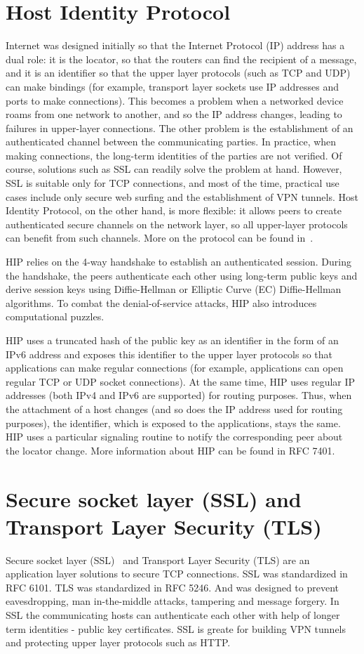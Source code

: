 \section{Host Identity Protocol}

Internet was designed initially so that the Internet Protocol (IP) address has a dual role: it 
is the locator, so that the routers can find the recipient of a message, and it is an identifier 
so that the upper layer protocols (such as TCP and UDP) can make bindings (for example, transport 
layer sockets use IP addresses and ports to make connections). This becomes a problem when a networked 
device roams from one network to another, and so the IP address changes, leading to failures in 
upper-layer connections. The other problem is the establishment of an authenticated channel between 
the communicating parties. In practice, when making connections, the long-term identities of the parties 
are not verified. Of course, solutions such as SSL can readily solve the problem at hand. However, SSL 
is suitable only for TCP connections, and most of the time, practical use cases include only secure web 
surfing and the establishment of VPN tunnels. Host Identity Protocol, on the other hand, is more flexible: 
it allows peers to create authenticated secure channels on the network layer, so all upper-layer protocols 
can benefit from such channels. More on the protocol can be found in~\cite{gurtov:hip}.

HIP relies on the 4-way handshake to establish an authenticated session. During the handshake, the 
peers authenticate each other using long-term public keys and derive session keys using Diffie-Hellman 
or Elliptic Curve (EC) Diffie-Hellman algorithms. To combat the denial-of-service attacks, HIP also 
introduces computational puzzles. 

HIP uses a truncated hash of the public key as an identifier in the form of an IPv6 address and 
exposes this identifier to the upper layer protocols so that applications can make regular 
connections (for example, applications can open regular TCP or UDP socket connections). At the 
same time, HIP uses regular IP addresses (both IPv4 and IPv6 are supported) for routing purposes. 
Thus, when the attachment of a host changes (and so does the IP address used for routing purposes), 
the identifier, which is exposed to the applications, stays the same. HIP uses a particular 
signaling routine to notify the corresponding peer about the locator change. More information 
about HIP can be found in RFC 7401. 

\section{Secure socket layer (SSL) and Transport Layer Security (TLS)}
Secure socket layer (SSL)~\cite{ssl} and Transport Layer Security (TLS) are an application 
layer solutions to secure TCP connections. SSL was standardized in RFC 6101. 
TLS was standardized in RFC 5246. And was designed to prevent eavesdropping, man 
in-the-middle attacks, tampering and message forgery. In SSL the communicating 
hosts can authenticate each other with help of longer term identities - public key certificates.
SSL is greate for building VPN tunnels and protecting upper layer protocols such as HTTP.